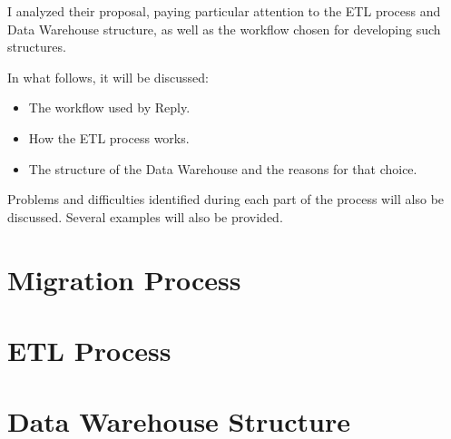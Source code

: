         I analyzed their proposal, paying particular attention to the ETL process and Data Warehouse structure, as well as the workflow chosen for developing such structures.
        
        In what follows, it will be discussed:
        \begin{itemize}
            \item The workflow used by Reply.
            \item How the ETL process works.
            \item The structure of the Data Warehouse and the reasons for that choice.
        \end{itemize}
        
        Problems and difficulties identified during each part of the process will also be discussed.
        Several examples will also be provided.

    \chapter{Migration Process} \label{section:organization}
        
    \chapter{ETL Process}
        
    \chapter{Data Warehouse Structure}
        